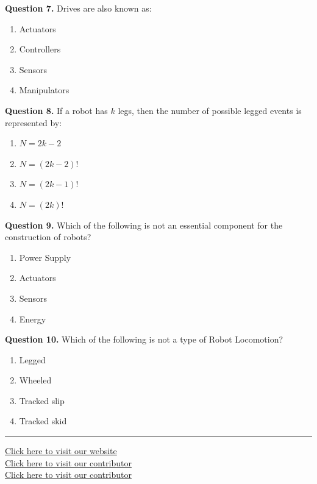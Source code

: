 \documentclass[11pt,a4paper]{article}
\begin{document}
\medskip


\noindent   \textbf{Question 7.} Drives are also known as:

\begin{enumerate}[label=(\alph*),itemsep=2pt]
  \item Actuators
  \item Controllers
  \item Sensors
  \item Manipulators
\end{enumerate}

\medskip


\noindent   \textbf{Question 8.} If a robot has $k$ legs, then the number of possible legged events is represented by:

\begin{enumerate}[label=(\alph*),itemsep=2pt]
  \item $N = 2k-2$
  \item $N = (2k-2)!$
  \item $N = (2k-1)!$
  \item $N = (2k)!$
\end{enumerate}

\medskip


\noindent   \textbf{Question 9.} Which of the following is not an essential component for the construction of robots?

\begin{enumerate}[label=(\alph*),itemsep=2pt]
  \item Power Supply
  \item Actuators
  \item Sensors
  \item Energy
\end{enumerate}

\medskip


\noindent   \textbf{Question 10.} Which of the following is not a type of Robot Locomotion?

\begin{enumerate}[label=(\alph*),itemsep=2pt]
  \item Legged
  \item Wheeled
  \item Tracked slip
  \item Tracked skid
\end{enumerate}

\vfill
\rule{\linewidth}{0.4pt}

\begin{center}\small
\href{https://bhu-exam.vercel.app/}{Click here to visit our website}\\[4pt]\href{https://me-aryan.vercel.app/}{Click here to visit our contributor}\\[4pt]\href{https://quashan-me.vercel.app/}{Click here to visit our contributor}
\end{center}
\end{document}
